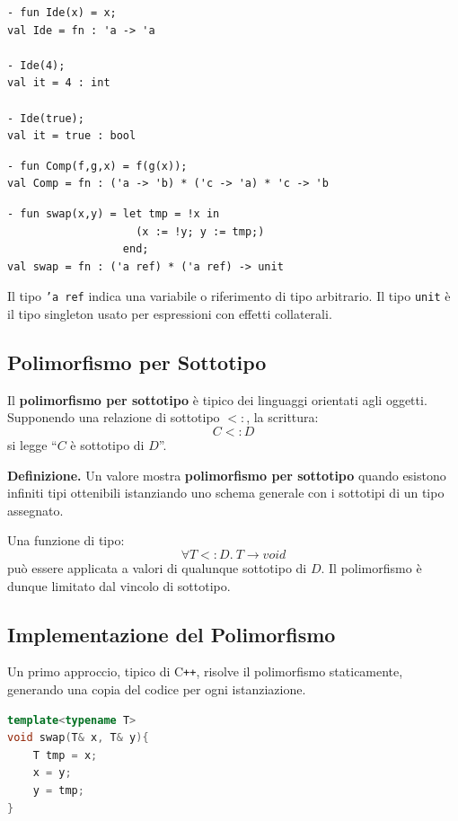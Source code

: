 \documentclass{article}
\begin{document}
\begin{lstlisting}
- fun Ide(x) = x;
val Ide = fn : 'a -> 'a

- Ide(4);
val it = 4 : int

- Ide(true);
val it = true : bool
\end{lstlisting}

\begin{lstlisting}
- fun Comp(f,g,x) = f(g(x));
val Comp = fn : ('a -> 'b) * ('c -> 'a) * 'c -> 'b
\end{lstlisting}

\begin{lstlisting}
- fun swap(x,y) = let tmp = !x in
                    (x := !y; y := tmp;)
                  end;
val swap = fn : ('a ref) * ('a ref) -> unit
\end{lstlisting}

Il tipo \texttt{'a ref} indica una variabile o riferimento di tipo arbitrario. Il tipo \texttt{unit} è il tipo singleton usato per espressioni con effetti collaterali.

\subsection{Polimorfismo per Sottotipo}

Il \textbf{polimorfismo per sottotipo} è tipico dei linguaggi orientati agli oggetti. Supponendo una relazione di sottotipo $<:$, la scrittura:
\[
C <: D
\]
si legge ``$C$ è sottotipo di $D$''.

\textbf{Definizione.} Un valore mostra \textbf{polimorfismo per sottotipo} quando esistono infiniti tipi ottenibili istanziando uno schema generale con i sottotipi di un tipo assegnato.

Una funzione di tipo:
\[
\forall T <: D.\ T \to void
\]
può essere applicata a valori di qualunque sottotipo di $D$. Il polimorfismo è dunque limitato dal vincolo di sottotipo.

\subsection{Implementazione del Polimorfismo}

Un primo approccio, tipico di C\texttt{++}, risolve il polimorfismo staticamente, generando una copia del codice per ogni istanziazione.

\begin{lstlisting}[language=C++]
template<typename T>
void swap(T& x, T& y){
    T tmp = x;
    x = y;
    y = tmp;
}
\end{lstlisting}
\end{document}
